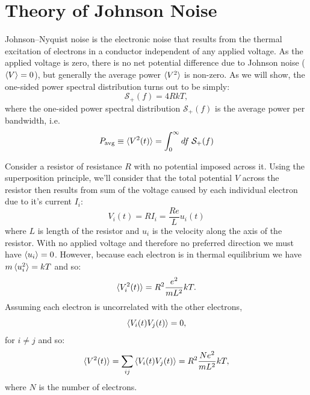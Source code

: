 \documentclass[12pt]{article}
\begin{document}
\section{Theory of Johnson Noise}

Johnson--Nyquist noise is the electronic noise that results from the thermal excitation of electrons in a conductor independent of any applied voltage.  As the applied voltage is zero, there is no net potential difference due to Johnson noise ($\braket{V}=0$), but generally the average power $\braket{V^2}$ is non-zero.  As we will show, the one-sided power spectral distribution turns out to be simply:
\begin{equation}
\mathcal{S}_{+}(f) = 4 R k T,
\end{equation}
where the one-sided power spectral distribution $\mathcal{S}_+(f)$ is the average power per bandwidth, i.e.
\begin{displaymath}
P_{\rm avg} \equiv \braket{V^2(t)} = \int_{0}^{\infty} df \; \mathcal{S}_{+}(f) 
\end{displaymath}

Consider a resistor of resistance $R$ with no potential imposed across it.  Using the superposition principle, we'll consider that the total potential $V$ across the resistor then results from sum of the voltage caused by each individual electron due to it's current $I_i$:
\begin{displaymath}
V_i(t) = R I_i = \frac{Re}{L} u_i(t)
\end{displaymath}
where $L$ is length of the resistor and $u_i$ is the velocity along the axis of the resistor.  With no applied voltage and therefore no preferred direction we must have $\braket{u_i}=0$.  However, because each electron is in thermal equilibrium we have $m\braket{u^2_i}=kT$ and so:
\begin{displaymath}
\braket{V^2_i(t)} = R^2 \frac{e^2}{m L^2} kT.
\end{displaymath}
Assuming each electron is uncorrelated with the other electrons,
\begin{displaymath}
\braket{V_i(t) V_j(t)} = 0,
\end{displaymath}
for $i \neq j$ and so:
\begin{displaymath}
\braket{V^2(t)} =  \sum_{ij}  \braket{ V_i(t) V_j(t) } = R^2 \frac{N e^2}{m L^2} kT,
\end{displaymath}
where $N$ is the number of electrons.
\end{document}
